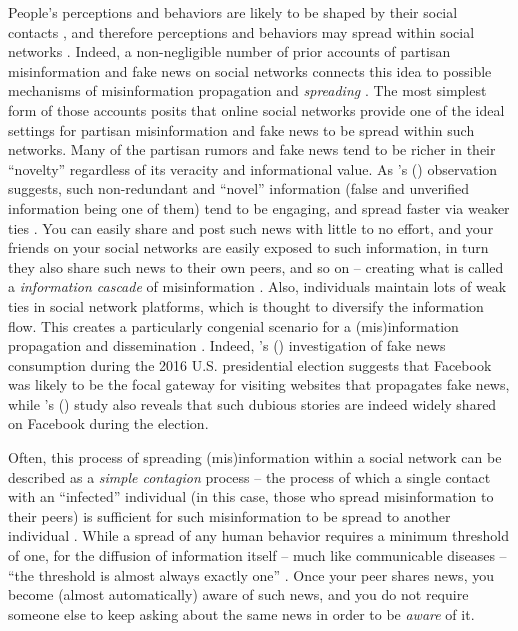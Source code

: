 \documentclass[man, 12pt, a4paper, nolmodern, noextraspace]{apa6}
\begin{document}
  People's perceptions and behaviors are likely to be shaped by their social contacts \parencite{lazer2010coevolution, centola2007complex}, and therefore perceptions and behaviors may spread within social networks \parencite[e.g.,][]{bond_61million}. Indeed, a non-negligible number of prior accounts of partisan misinformation and fake news on social networks connects this idea to possible mechanisms of misinformation propagation and \emph{spreading}  \parencite[e.g.,][]{del2016spreading, Bakshy_2012}. The most simplest form of those accounts posits that online social networks provide one of the ideal settings for partisan misinformation and fake news to be spread within such networks. Many of the partisan rumors and fake news tend to be richer in their \enquote{novelty} \parencite{wu2007novelty} regardless of its veracity and informational value. As \citeauthor{giglietto2016fakes}'s (\citeyear{giglietto2016fakes}) observation suggests, such non-redundant and \enquote{novel} information (false and unverified information being one of them) tend to be engaging, and spread faster via weaker ties \parencite{granovetter1977strength}. You can easily share and post such news with little to no effort, and your friends on your social networks are easily exposed to such information, in turn they also share such news to their own peers, and so on -- creating what is called a \emph{information cascade} of misinformation \parencite{del2016spreading}. Also, individuals maintain lots of weak ties in social network platforms, which is thought to diversify the information flow. This creates a particularly congenial scenario for a (mis)information propagation and dissemination \parencite{Bakshy_2012, granovetter1977strength}. Indeed, \citeauthor{guess2018selective}'s (\citeyear{guess2018selective}) investigation of fake news consumption during the 2016 U.S. presidential election suggests that Facebook was likely to be the focal gateway for visiting websites that propagates fake news, while \citeauthor{allcott2017social}'s (\citeyear{allcott2017social}) study also reveals that such dubious stories are indeed widely shared on Facebook during the election. 
    
    Often, this process of spreading (mis)information within a social network can be described as a \emph{simple contagion} process -- the process of which a single contact with an \enquote{infected} individual (in this case, those who spread misinformation to their peers) is sufficient for such misinformation to be spread to another individual \parencite{Monsted_plos2017, Centola2010Sience, siegel2009social}. While a spread of any human behavior requires a minimum threshold of one, for the diffusion of information itself -- much like communicable diseases -- \enquote{the threshold is almost always exactly one}  \parencites[][p. 706]{centola2007complex}[also see][]{Centola2010Sience}. Once your peer shares news, you become (almost automatically) aware of such news, and you do not require someone else to keep asking about the same news in order to be \emph{aware} of it.  
    
\end{document}
